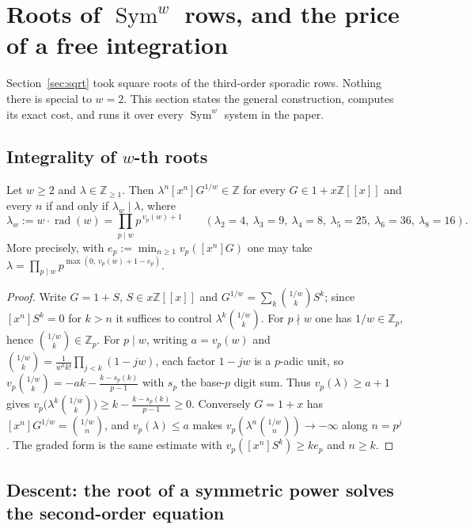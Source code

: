 \section{Roots of $\operatorname{Sym}^w$ rows, and the price of a free integration}\label{sec:rootrows}

Section~\ref{sec:sqrt} took square roots of the third-order sporadic rows. Nothing there is
special to $w=2$. This section states the general construction, computes its exact cost, and
runs it over every $\operatorname{Sym}^w$ system in the paper.

\subsection{Integrality of $w$-th roots}

\begin{theorem}\label{thm:rootint}
\Proved{} Let $w\ge2$ and $\lambda\in\mathbb Z_{\ge1}$. Then $\lambda^n[x^n]G^{1/w}\in\mathbb Z$
for every $G\in1+x\mathbb Z[[x]]$ and every $n$ if and only if $\lambda_w\mid\lambda$, where
\[
\lambda_w:=w\cdot\operatorname{rad}(w)=\prod_{p\mid w}p^{\,v_p(w)+1}
\qquad(\lambda_2=4,\ \lambda_3=9,\ \lambda_4=8,\ \lambda_5=25,\ \lambda_6=36,\ \lambda_8=16).
\]
More precisely, with $e_p:=\min_{n\ge1}v_p([x^n]G)$ one may take
$\lambda=\prod_{p\mid w}p^{\max(0,\,v_p(w)+1-e_p)}$.
\end{theorem}
\begin{proof}
Write $G=1+S$, $S\in x\mathbb Z[[x]]$ and $G^{1/w}=\sum_k\binom{1/w}{k}S^k$; since
$[x^n]S^k=0$ for $k>n$ it suffices to control $\lambda^k\binom{1/w}{k}$. For $p\nmid w$ one
has $1/w\in\mathbb Z_p$, hence $\binom{1/w}{k}\in\mathbb Z_p$. For $p\mid w$, writing
$a=v_p(w)$ and $\binom{1/w}{k}=\frac1{w^kk!}\prod_{j<k}(1-jw)$, each factor $1-jw$ is a
$p$-adic unit, so
$v_p\binom{1/w}{k}=-ak-\frac{k-s_p(k)}{p-1}$ with $s_p$ the base-$p$ digit sum. Thus
$v_p(\lambda)\ge a+1$ gives $v_p\bigl(\lambda^k\binom{1/w}{k}\bigr)\ge k-\frac{k-s_p(k)}{p-1}\ge0$.
Conversely $G=1+x$ has $[x^n]G^{1/w}=\binom{1/w}{n}$, and $v_p(\lambda)\le a$ makes
$v_p(\lambda^n\binom{1/w}{n})\to-\infty$ along $n=p^j$. The graded form is the same estimate
with $v_p([x^n]S^k)\ge ke_p$ and $n\ge k$.
\end{proof}

\subsection{Descent: the root of a symmetric power solves the second-order equation}


